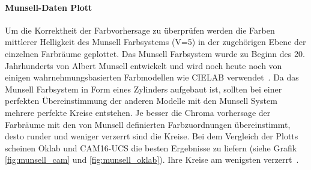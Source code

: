 \documentclass[12pt, a4paper, ngerman]{article}
\begin{document}
\paragraph{Munsell-Daten Plott}
Um die Korrektheit der Farbvorhersage zu überprüfen werden die Farben mittlerer Helligkeit des Munsell Farbsystems (V=5) 
in der zugehörigen Ebene der einzelnen Farbräume geplottet. 
Das Munsell Farbsystem wurde zu Beginn des 20. Jahrhunderts von Albert Munsell entwickelt und 
wird noch heute noch von einigen wahrnehmungsbasierten Farbmodellen wie CIELAB verwendet~\cite{Munsell_color_system_2022}.
Da das Munsell Farbsystem in Form eines Zylinders aufgebaut ist, 
sollten bei einer perfekten Übereinstimmung der anderen Modelle mit den Munsell System mehrere perfekte Kreise entstehen.
Je besser die Chroma vorhersage der Farbräume mit den von Munsell definierten Farbzuordnungen übereinstimmt, 
desto runder und weniger verzerrt sind die Kreise. Bei dem Vergleich der Plotts scheinen Oklab und CAM16-UCS die besten Ergebnisse zu liefern (siehe Grafik \ref{fig:munsell_cam} und \ref{fig:munsell_oklab}). 
Ihre Kreise am wenigsten verzerrt~\cite{Oklab_2020}.
\end{document}
